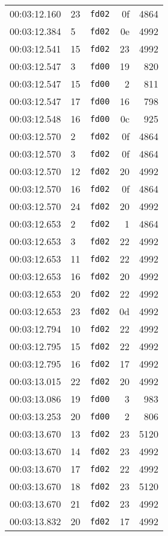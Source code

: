 \documentclass{article}
\begin{document}
\begin{longtable}{lllrr}
00:03:12.160 & 23 & \texttt{fd02} & 0f & 4864 \\
00:03:12.384 & 5 & \texttt{fd02} & 0e & 4992 \\
00:03:12.541 & 15 & \texttt{fd02} & 23 & 4992 \\
00:03:12.547 & 3 & \texttt{fd00} & 19 & 820 \\
00:03:12.547 & 15 & \texttt{fd00} & 2 & 811 \\
00:03:12.547 & 17 & \texttt{fd00} & 16 & 798 \\
00:03:12.548 & 16 & \texttt{fd00} & 0c & 925 \\
00:03:12.570 & 2 & \texttt{fd02} & 0f & 4864 \\
00:03:12.570 & 3 & \texttt{fd02} & 0f & 4864 \\
00:03:12.570 & 12 & \texttt{fd02} & 20 & 4992 \\
00:03:12.570 & 16 & \texttt{fd02} & 0f & 4864 \\
00:03:12.570 & 24 & \texttt{fd02} & 20 & 4992 \\
00:03:12.653 & 2 & \texttt{fd02} & 1 & 4864 \\
00:03:12.653 & 3 & \texttt{fd02} & 22 & 4992 \\
00:03:12.653 & 11 & \texttt{fd02} & 22 & 4992 \\
00:03:12.653 & 16 & \texttt{fd02} & 20 & 4992 \\
00:03:12.653 & 20 & \texttt{fd02} & 22 & 4992 \\
00:03:12.653 & 23 & \texttt{fd02} & 0d & 4992 \\
00:03:12.794 & 10 & \texttt{fd02} & 22 & 4992 \\
00:03:12.795 & 15 & \texttt{fd02} & 22 & 4992 \\
00:03:12.795 & 16 & \texttt{fd02} & 17 & 4992 \\
00:03:13.015 & 22 & \texttt{fd02} & 20 & 4992 \\
00:03:13.086 & 19 & \texttt{fd00} & 3 & 983 \\
00:03:13.253 & 20 & \texttt{fd00} & 2 & 806 \\
00:03:13.670 & 13 & \texttt{fd02} & 23 & 5120 \\
00:03:13.670 & 14 & \texttt{fd02} & 23 & 4992 \\
00:03:13.670 & 17 & \texttt{fd02} & 22 & 4992 \\
00:03:13.670 & 18 & \texttt{fd02} & 23 & 5120 \\
00:03:13.670 & 21 & \texttt{fd02} & 23 & 4992 \\
00:03:13.832 & 20 & \texttt{fd02} & 17 & 4992 \\

\end{longtable}
\end{document}
